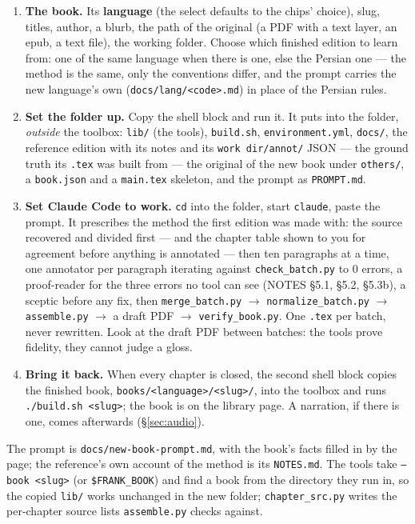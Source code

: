 \documentclass[11pt,oneside]{report}
\newcommand{\file}[1]{\texttt{#1}}
\begin{document}
\begin{enumerate}
\item \textbf{The book.} Its \textbf{language} (the select defaults to the
  chips' choice), slug, titles, author, a blurb, the path of the original (a
  PDF with a text layer, an epub, a text file), the working folder. Choose
  which finished edition to learn from: one of the same language when there
  is one, else the Persian one --- the method is the same, only the
  conventions differ, and the prompt carries the new language's own
  (\file{docs/lang/<code>.md}) in place of the Persian rules.
\item \textbf{Set the folder up.} Copy the shell block and run it. It puts
  into the folder, \emph{outside} the toolbox: \file{lib/} (the tools),
  \file{build.sh}, \file{environment.yml}, \file{docs/}, the reference
  edition with its notes and its \file{work dir/annot/} JSON --- the ground
  truth its \file{.tex} was built from --- the original of the new book under
  \file{others/}, a \file{book.json} and a \file{main.tex} skeleton, and the
  prompt as \file{PROMPT.md}.
\item \textbf{Set Claude Code to work.} \texttt{cd} into the folder, start
  \texttt{claude}, paste the prompt. It prescribes the method the first
  edition was made with: the source recovered and divided first --- and the
  chapter table shown to you for agreement before anything is annotated ---
  then ten paragraphs at a time, one annotator per paragraph iterating
  against \file{check\_batch.py} to 0 errors, a proof-reader for the three
  errors no tool can see (NOTES §5.1, §5.2, §5.3b), a sceptic before any
  fix, then \file{merge\_batch.py} $\rightarrow$ \file{normalize\_batch.py}
  $\rightarrow$ \file{assemble.py} $\rightarrow$ a draft PDF $\rightarrow$
  \file{verify\_book.py}. One \file{.tex} per batch, never rewritten. Look
  at the draft PDF between batches: the tools prove fidelity, they cannot
  judge a gloss.
\item \textbf{Bring it back.} When every chapter is closed, the second shell
  block copies the finished book, \file{books/<language>/<slug>/}, into the toolbox and runs
  \file{./build.sh <slug>}; the book is on the library page. A narration, if
  there is one, comes afterwards (\S\ref{sec:audio}).
\end{enumerate}

The prompt is \file{docs/new-book-prompt.md}, with the book's facts filled
in by the page; the reference's own account of the method is its
\file{NOTES.md}. The tools take \texttt{--book <slug>} (or
\texttt{\$FRANK\_BOOK}) and find a book from the directory they run in, so
the copied \file{lib/} works unchanged in the new folder; \file{chapter\_src.py}
writes the per-chapter source lists \file{assemble.py} checks against.
\end{document}
